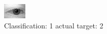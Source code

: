 \begin{figure}[h!]
\begin{center}
\includegraphics[width=0.60\columnwidth]{figures/ID416_class_1_target_2.png}
\end{center}
\caption{ Classification: 1 actual target: 2}
\label{fig:ID416_class_1_target_2}
\end{figure}
